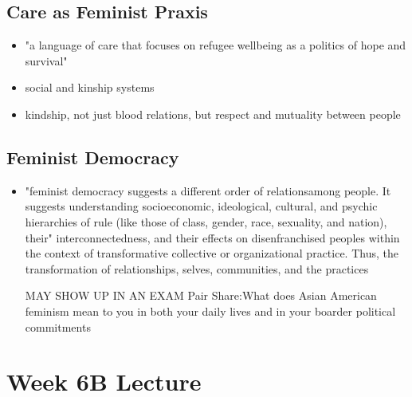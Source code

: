 \documentclass{article}
\begin{document}
\subsection{Care as Feminist Praxis}
\begin{itemize}
  \item "a language of care that focuses on refugee wellbeing as a 
    politics of hope and survival"
  \item social and kinship systems
  \item kindship, not just blood relations, but respect and mutuality between people
\end{itemize}

\subsection{Feminist Democracy}
\begin{itemize}
  \item "feminist democracy suggests a different order of relationsamong people.
    It suggests understanding socioeconomic, ideological, cultural, and psychic
    hierarchies of rule (like those of class, gender, race, sexuality, and nation), their"
    interconnectedness, and their effects on disenfranchised peoples within
    the context of transformative collective or organizational practice.
    Thus, the transformation of relationships, selves, communities, and the practices

    MAY SHOW UP IN AN EXAM
    Pair Share:What does Asian American feminism mean to you in both your daily lives and in your
    boarder political commitments
\end{itemize}

\section*{Week 6B Lecture}
\end{document}
